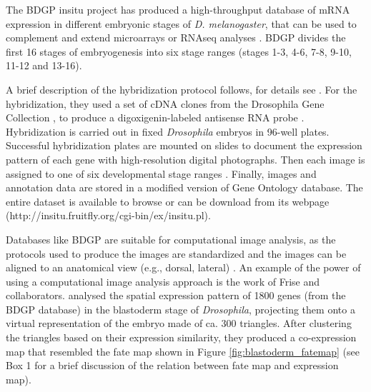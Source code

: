 The BDGP insitu project has produced a high-throughput database of mRNA expression in different embryonic stages of \textit{D. melanogaster}, that can be used to complement and extend microarrays or RNAseq analyses \citep{Tomancak2002}. 
BDGP divides the first 16 stages of embryogenesis into six stage ranges (stages 1-3, 4-6, 7-8, 9-10, 11-12 and 13-16).

A brief description of the hybridization protocol follows, for details see \citep{Tomancak2002}.
For the hybridization, they used a set of cDNA clones from the Drosophila Gene Collection \citep{Stapleton2002}, to produce a digoxigenin-labeled antisense RNA probe \citep{Tomancak2002}.
Hybridization is carried out in fixed \textit{Drosophila} embryos in 96-well plates. Successful hybridization plates are mounted on slides to document the expression pattern of each gene with high-resolution digital photographs. Then each image is assigned to one of six developmental stage ranges \citep{Weiszmann2009a}.
%
Finally, images and annotation data are stored in a modified version of Gene Ontology database. The entire dataset is available to browse or can be download from its webpage (http://insitu.fruitfly.org/cgi-bin/ex/insitu.pl).

Databases like BDGP are suitable for computational image analysis, as the protocols used to produce the images are standardized \citep{Tomancak2002} and the images can be aligned to an anatomical view (e.g., dorsal, lateral) \citep{Kumar2011}.
An example of the power of using a computational image analysis approach is the work of Frise and collaborators.
\citet{Frise2010} analysed the spatial expression pattern of 1800 genes (from the BDGP database) in the blastoderm stage of \textit{Drosophila}, projecting them onto a virtual representation of the embryo made of ca. 300 triangles.
After clustering the triangles based on their expression similarity, they produced a co-expression map that resembled the fate map shown in Figure \ref{fig:blastoderm_fatemap} (see Box 1 for a brief discussion of the relation between fate map and expression map).

